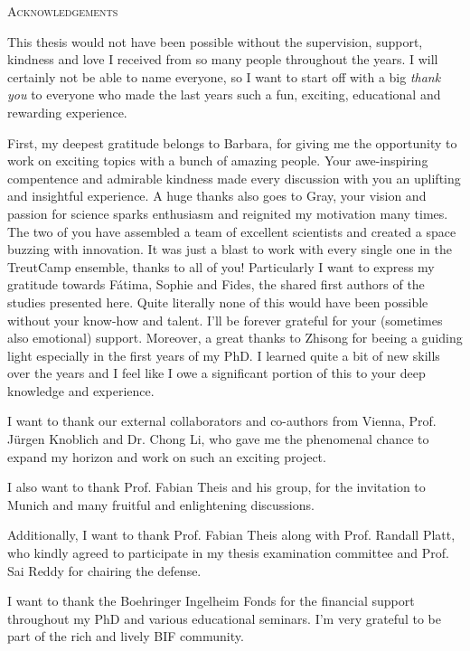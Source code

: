 \begin{center}
    \large\textsc{Acknowledgements}
\end{center}

This thesis would not have been possible without the supervision, support, kindness and love I received from so many people throughout the years. I will certainly not be able to name everyone, so I want to start off with a big \textit{thank you} to everyone who made the last years such a fun, exciting, educational and rewarding experience. 

First, my deepest gratitude belongs to Barbara, for giving me the opportunity to work on exciting topics with a bunch of amazing people. Your awe-inspiring compentence and admirable kindness made every discussion with you an uplifting and insightful experience. A huge thanks also goes to Gray, your vision and passion for science sparks enthusiasm and reignited my motivation many times. The two of you have assembled a team of excellent scientists and created a space buzzing with innovation. It was just a blast to work with every single one in the TreutCamp ensemble, thanks to all of you! Particularly I want to express my gratitude towards Fátima, Sophie and Fides, the shared first authors of the studies presented here. Quite literally none of this would have been possible without your know-how and talent. I'll be forever grateful for your (sometimes also emotional) support. Moreover, a great thanks to Zhisong for beeing a guiding light especially in the first years of my PhD. I learned quite a bit of new skills over the years and I feel like I owe a significant portion of this to your deep knowledge and experience. 

I want to thank our external collaborators and co-authors from Vienna, Prof. Jürgen Knoblich and Dr. Chong Li, who gave me the phenomenal chance to expand my horizon and work on such an exciting project. 

I also want to thank Prof. Fabian Theis and his group, for the invitation to Munich and many fruitful and enlightening discussions. 

Additionally, I want to thank Prof. Fabian Theis along with Prof. Randall Platt, who kindly agreed to participate in my thesis examination committee and Prof. Sai Reddy for chairing the defense. 

I want to thank the Boehringer Ingelheim Fonds for the financial support throughout my PhD and various educational seminars. I'm very grateful to be part of the rich and lively BIF community. 

